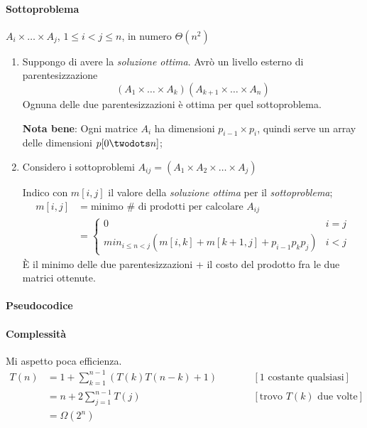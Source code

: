 \paragraph{Sottoproblema} $A_i \times \ldots \times A_j$, $1 \leq i < j \leq n$, in numero $\Theta(n^2)$
\begin{enumerate}
    \item Suppongo di avere la \textit{soluzione ottima}. Avrò un livello esterno di parentesizzazione
    $$(A_1 \times \ldots \times A_k)(A_{k+1} \times \ldots \times A_n)$$
    Ognuna delle due parentesizzazioni è ottima per quel sottoproblema.

    \textbf{Nota bene}: Ogni matrice $A_i$ ha dimensioni $p_{i-1} \times p_i$, quindi serve un array delle dimensioni $p[0\twodots n]$;

    \item Considero i sottoproblemi $A_{ij} = (A_1 \times A_2 \times \ldots \times A_j)$ \par
    Indico con $m[i,j]$ il valore della \emph{soluzione ottima} per il \textit{sottoproblema};
    \begin{align*}
        m[i,j] & = \text{minimo } \# \text{ di prodotti per calcolare } A_{ij} \\
        & =
        \begin{cases}
            0 & i = j \\
            min_{i \leq n < j} \left( m[i,k] + m[k+1,j] + p_{i-1} p_k p_j \right) & i < j
        \end{cases}
    \end{align*}
    È il minimo delle due parentesizzazioni + il costo del prodotto fra le due matrici ottenute.
\end{enumerate}

\paragraph{Pseudocodice}


\paragraph{Complessità} Mi aspetto poca efficienza.
\begin{align*}
    T(n) & = 1 + \displaystyle\sum_{k=1}^{n-1} \left( T(k) T(n-k) + 1 \right) \qquad && \left[ 1 \text{ costante qualsiasi} \right] \\
    & = n + 2\displaystyle\sum_{j=1}^{n-1}T(j) \quad && \left[ \text{trovo } T(k) \text{ due volte} \right] \\
    & = \Omega(2^n)
\end{align*}

